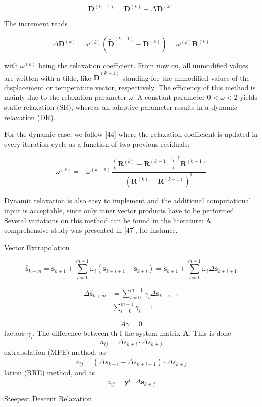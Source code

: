 $$
\mathbf{D}^{(k+1)}=\mathbf{D}^{(k)}+\Delta \mathbf{D}^{(k)}
$$

The increment reads

$$
\Delta \mathbf{D}^{(k)}=\omega^{(k)}\left(\tilde{\mathbf{D}}^{(k+1)}-\mathbf{D}^{(k)}\right)=\omega^{(k)} \mathbf{R}^{(k)}
$$

with $\omega^{(k)}$ being the relaxation coefficient. From now on, all unmodified values are written with a tilde, like $\tilde{\mathbf{D}}^{(k+1)}$ standing for the unmodified values of the displacement or temperature vector, respectively. The efficiency of this method is mainly due to the relaxation parameter $\omega$. A constant parameter $0<\omega<2$ yields static relaxation (SR), whereas an adaptive parameter results in a dynamic relaxation (DR).

For the dynamic case, we follow [44] where the relaxation coefficient is updated in every iteration cycle as a function of two previous residuals:

$$
\omega^{(k)}=-\omega^{(k-1)} \frac{\left(\mathbf{R}^{(k)}-\mathbf{R}^{(k-1)}\right)^{\mathrm{T}} \mathbf{R}^{(k-1)}}{\left(\mathbf{R}^{(k)}-\mathbf{R}^{(k-1)}\right)^{2}}
$$

Dynamic relaxation is also easy to implement and the additional computational input is acceptable, since only inner vector products have to be performed. Several variations on this method can be found in the literature: A comprehensive study was presented in [47], for instance.

 Vector Extrapolation

$$
\hat{\boldsymbol{s}}_{k+m}=\boldsymbol{s}_{k+1}+\sum_{i=1}^{m-1} \omega_{i}\left(\boldsymbol{s}_{k+i+1}-\boldsymbol{s}_{k+i}\right)=\boldsymbol{s}_{k+1}+\sum_{i=1}^{m-1} \omega_{i} \Delta \boldsymbol{s}_{k+i+1}
$$

$$
\begin{aligned}\Delta \hat{\boldsymbol{s}}_{k+m} &=\sum_{i=0}^{m-1} \gamma_{i} \Delta \boldsymbol{s}_{k+i+1} \\& \sum_{i=0}^{m-1} \gamma_{i}=1\end{aligned}
$$

\[
A \gamma=0
\]
factors \(\gamma_{i}\). The difference between th f the system matrix \(\boldsymbol{A}\). This is done
\[
a_{i j}=\Delta s_{k+i} \cdot \Delta s_{k+j}
\]
extrapolation (MPE) method, as
\[
a_{i j}=\left(\Delta s_{k+i}-\Delta s_{k+i-1}\right) \cdot \Delta s_{k+j}
\]
lation (RRE) method, and as
\[
a_{i j}=\boldsymbol{y}^{i} \cdot \Delta \boldsymbol{s}_{k+j}
\]

 Steepest Descent Relaxation

